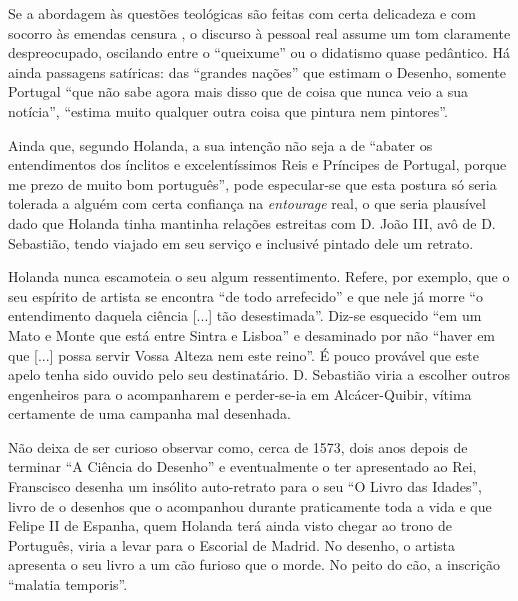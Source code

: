 \documentclass{article}
\begin{document}
Se a abordagem às questões teológicas são feitas com certa delicadeza
e com socorro às emendas censura , o discurso à pessoal real assume um
tom claramente despreocupado, oscilando entre o ``queixume'' ou o
didatismo quase pedântico. Há ainda passagens satíricas: das ``grandes
nações'' que estimam o Desenho, somente Portugal ``que não sabe agora
mais disso que de coisa que nunca veio a sua notícia'', ``estima muito
qualquer outra coisa que pintura nem pintores''.

Ainda que, segundo Holanda, a sua intenção não seja a de ``abater os
entendimentos dos ínclitos e excelentíssimos Reis e Príncipes de
Portugal, porque me prezo de muito bom português'', pode especular-se
que esta postura só seria tolerada a alguém com certa confiança na
\emph{entourage} real, o que seria plausível dado que Holanda tinha
mantinha relações estreitas com D. João III, avô de D. Sebastião,
tendo viajado em seu serviço e inclusivé pintado dele um retrato.

Holanda nunca escamoteia o seu algum ressentimento. Refere, por
exemplo, que o seu espírito de artista se encontra ``de todo
arrefecido'' e que nele já morre ``o entendimento daquela ciência
[...] tão desestimada''. Diz-se esquecido ``em um Mato e Monte que
está entre Sintra e Lisboa'' e desaminado por não ``haver em que [...]
possa servir Vossa Alteza nem este reino''. É pouco provável que este
apelo tenha sido ouvido pelo seu destinatário. D. Sebastião viria a
escolher outros engenheiros para o acompanharem \cite[p.54]{holanda} e
perder-se-ia em Alcácer-Quibir, vítima certamente de uma campanha mal
desenhada.

Não deixa de ser curioso observar como, cerca de 1573, dois anos
depois de terminar ``A Ciência do Desenho'' e eventualmente o ter
apresentado ao Rei, Franscisco desenha um insólito auto-retrato para o
seu ``O Livro das Idades'', livro de o desenhos que o acompanhou
durante praticamente toda a vida e que Felipe II de Espanha, quem
Holanda terá ainda visto chegar ao trono de Português, viria a levar
para o Escorial de Madrid. No desenho, o artista apresenta o seu livro
a um cão furioso que o morde. No peito do cão, a inscrição ``malatia
temporis''.

\printbibliography[heading=bibliography,title={Bibliografia}]
\end{document}
